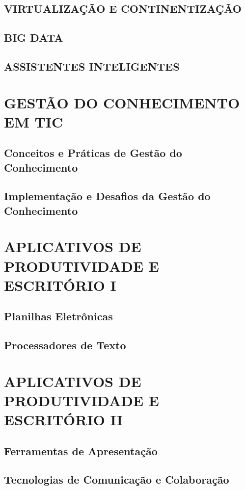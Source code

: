 \documentclass[
]{book}
\begin{document}
\section{VIRTUALIZAÇÃO E CONTINENTIZAÇÃO}\label{virtualizauxe7uxe3o-e-continentizauxe7uxe3o}

\section{BIG DATA}\label{big-data}

\section{ASSISTENTES INTELIGENTES}\label{assistentes-inteligentes}

\chapter{GESTÃO DO CONHECIMENTO EM TIC}\label{gestuxe3o-do-conhecimento-em-tic}

\section{Conceitos e Práticas de Gestão do Conhecimento}\label{conceitos-e-pruxe1ticas-de-gestuxe3o-do-conhecimento}

\section{Implementação e Desafios da Gestão do Conhecimento}\label{implementauxe7uxe3o-e-desafios-da-gestuxe3o-do-conhecimento}

\chapter{APLICATIVOS DE PRODUTIVIDADE E ESCRITÓRIO I}\label{aplicativos-de-produtividade-e-escrituxf3rio-i}

\section{Planilhas Eletrônicas}\label{planilhas-eletruxf4nicas}

\section{Processadores de Texto}\label{processadores-de-texto}

\chapter{APLICATIVOS DE PRODUTIVIDADE E ESCRITÓRIO II}\label{aplicativos-de-produtividade-e-escrituxf3rio-ii}

\section{Ferramentas de Apresentação}\label{ferramentas-de-apresentauxe7uxe3o}

\section{Tecnologias de Comunicação e Colaboração}\label{tecnologias-de-comunicauxe7uxe3o-e-colaborauxe7uxe3o}

  
\end{document}
